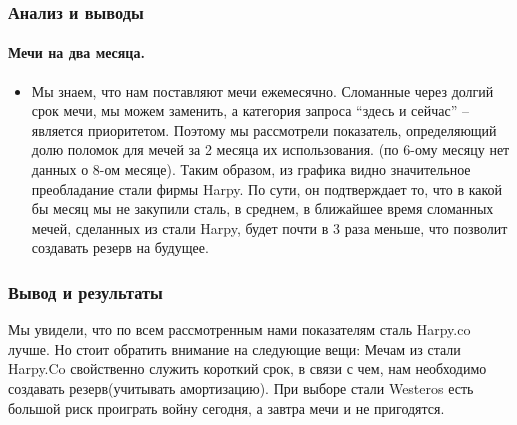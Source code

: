 \documentclass[8pt,pdf,hyperref={unicode}]{beamer}
\begin{document}
	\begin{frame}
	\frametitle{Анализ и выводы}
	\framesubtitle{Мечи на два месяца.}
	\begin{itemize}
		\item   Мы знаем, что нам поставляют мечи ежемесячно. Сломанные через долгий срок мечи, мы можем заменить, а категория запроса “здесь и сейчас” – является приоритетом. Поэтому мы рассмотрели показатель, определяющий долю поломок для мечей за 2 месяца их использования. (по 6-ому месяцу нет данных о 8-ом месяце). Таким образом, из графика видно значительное преобладание стали фирмы Harpy. По сути, он подтверждает то, что в какой бы месяц мы не закупили сталь, в среднем, в ближайшее время сломанных мечей, сделанных из стали Harpy, будет почти в 3 раза меньше, что позволит создавать резерв на будущее.  				
		\end{itemize}
	\end{frame}
	\begin{frame}
	\frametitle{Вывод и результаты}
	Мы увидели, что по всем рассмотренным нами показателям сталь Harpy.co лучше.  Но стоит обратить внимание на следующие вещи:
Мечам из стали Harpy.Co свойственно служить короткий срок, в связи с чем, нам необходимо создавать резерв(учитывать амортизацию).
При выборе стали Westeros есть большой риск проиграть войну сегодня, а завтра мечи и не пригодятся.
	\end{frame}
	
	
\end{document}
